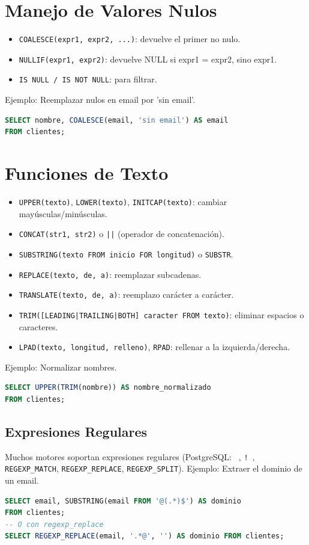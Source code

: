 \documentclass[12pt,a4paper,openany,oneside]{book}
\begin{document}
\section{Manejo de Valores Nulos}
\begin{itemize}
    \item \texttt{COALESCE(expr1, expr2, ...)}: devuelve el primer no nulo.
    \item \texttt{NULLIF(expr1, expr2)}: devuelve NULL si expr1 = expr2, sino expr1.
    \item \texttt{IS NULL / IS NOT NULL}: para filtrar.
\end{itemize}
Ejemplo: Reemplazar nulos en email por 'sin email'.
\begin{lstlisting}[language=SQL]
SELECT nombre, COALESCE(email, 'sin email') AS email
FROM clientes;
\end{lstlisting}

\section{Funciones de Texto}
\begin{itemize}
    \item \texttt{UPPER(texto)}, \texttt{LOWER(texto)}, \texttt{INITCAP(texto)}: cambiar mayúsculas/minúsculas.
    \item \texttt{CONCAT(str1, str2)} o \texttt{||} (operador de concatenación).
    \item \texttt{SUBSTRING(texto FROM inicio FOR longitud)} o \texttt{SUBSTR}.
    \item \texttt{REPLACE(texto, de, a)}: reemplazar subcadenas.
    \item \texttt{TRANSLATE(texto, de, a)}: reemplazo carácter a carácter.
    \item \texttt{TRIM([LEADING|TRAILING|BOTH] caracter FROM texto)}: eliminar espacios o caracteres.
    \item \texttt{LPAD(texto, longitud, relleno)}, \texttt{RPAD}: rellenar a la izquierda/derecha.
\end{itemize}
Ejemplo: Normalizar nombres.
\begin{lstlisting}[language=SQL]
SELECT UPPER(TRIM(nombre)) AS nombre_normalizado
FROM clientes;
\end{lstlisting}

\subsection{Expresiones Regulares}
Muchos motores soportan expresiones regulares (PostgreSQL: \texttt{~}, \texttt{!~}, \texttt{REGEXP\_MATCH}, \texttt{REGEXP\_REPLACE}, \texttt{REGEXP\_SPLIT}).
Ejemplo: Extraer el dominio de un email.
\begin{lstlisting}[language=SQL]
SELECT email, SUBSTRING(email FROM '@(.*)$') AS dominio
FROM clientes;
-- O con regexp_replace
SELECT REGEXP_REPLACE(email, '.*@', '') AS dominio FROM clientes;
\end{lstlisting}
\end{document}
